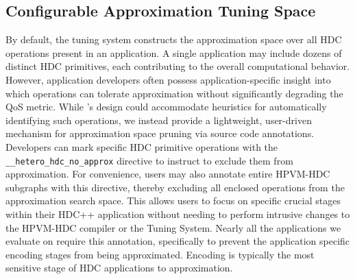 \vspace{-.2 in}
\subsection{Configurable Approximation Tuning Space}
\label{sec:hdc-no-approx}
By default, the tuning system constructs the approximation space over all HDC operations present in an application. A single application may include dozens of distinct HDC primitives, each contributing to the overall computational behavior. 
However, application developers often possess application-specific insight into which operations can tolerate approximation without significantly degrading the QoS metric. While \pname{}’s design could accommodate heuristics for automatically identifying such operations, we instead provide a lightweight, user-driven mechanism for approximation space pruning via source code annotations. Developers can mark specific HDC primitive operations with the \textcolor{blue!41!black}{\texttt{\_\_hetero\_hdc\_no\_approx}} directive to instruct \pname{} to exclude them from approximation. For convenience, users may also annotate entire HPVM-HDC subgraphs with this directive, thereby excluding all enclosed operations from the approximation search space.
This allows users to focus on specific crucial stages within their HDC++ application without needing to perform intrusive changes to the HPVM-HDC compiler or the \pname{} Tuning System. 
Nearly all the applications we evaluate \pname{} on require this annotation, specifically to prevent the application specific encoding stages from being approximated. Encoding is typically the most sensitive stage of HDC applications to approximation. 


